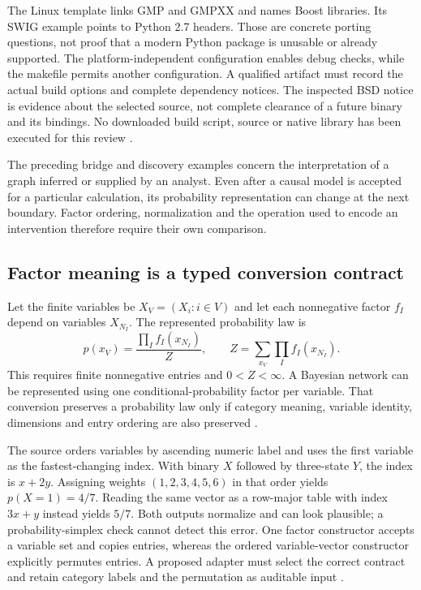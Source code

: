 The Linux template links GMP and GMPXX and names Boost libraries. Its SWIG
example points to Python 2.7 headers. Those are concrete porting questions,
not proof that a modern Python package is unusable or already supported.
The platform-independent configuration enables debug checks, while the
makefile permits another configuration. A qualified artifact must record
the actual build options and complete dependency notices. The inspected BSD
notice is evidence about the selected source, not complete clearance of a
future binary and its bindings. No downloaded build script, source or native
library has been executed for this review \citep{exec24_libdai_source}.

The preceding bridge and discovery examples concern the interpretation of a
graph inferred or supplied by an analyst. Even after a causal model is
accepted for a particular calculation, its probability representation can
change at the next boundary. Factor ordering, normalization and the operation
used to encode an intervention therefore require their own comparison.

\subsection{Factor meaning is a typed conversion contract}
Let the finite variables be $X_V=(X_i:i\in V)$ and let each nonnegative factor
$f_I$ depend on variables $X_{N_I}$. The represented probability law is
\[
 p(x_V)=\frac{\prod_I f_I(x_{N_I})}{Z},\qquad
 Z=\sum_{x_V}\prod_I f_I(x_{N_I}).
\]
This requires finite nonnegative entries and $0<Z<\infty$. A Bayesian network
can be represented using one conditional-probability factor per variable.
That conversion preserves a probability law only if category meaning,
variable identity, dimensions and entry ordering are also preserved
\citep{exec24_libdai_paper,exec24_libdai_source}.

The source orders variables by ascending numeric label and uses the first
variable as the fastest-changing index. With binary $X$ followed by
three-state $Y$, the index is $x+2y$. Assigning weights $(1,2,3,4,5,6)$ in
that order yields $p(X=1)=4/7$. Reading the same vector as a row-major table
with index $3x+y$ instead yields $5/7$. Both outputs normalize and can look
plausible; a probability-simplex check cannot detect this error. One factor
constructor accepts a variable set and copies entries, whereas the ordered
variable-vector constructor explicitly permutes entries. A proposed adapter
must select the correct contract and retain category labels and the
permutation as auditable input \citep{exec24_libdai_source,exec24_libdai_choice}.

